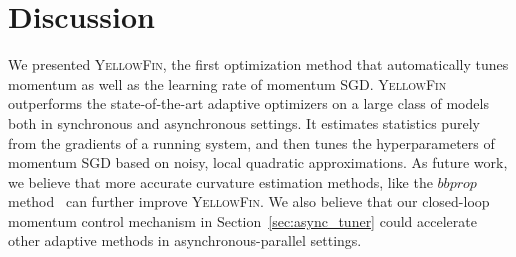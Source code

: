 \documentclass{article}
\newcommand{\tuner}{\textsc{YellowFin}\xspace}
\begin{document}
\vspace{-0.5em}
\section{Discussion}
\label{sec:discussion}
\vspace{-0.45em}
We presented \tuner, the first optimization method that automatically tunes momentum as well as the learning rate of momentum SGD. 
\tuner outperforms the state-of-the-art adaptive optimizers on a large class of models both in synchronous and asynchronous settings.
It estimates statistics purely from the gradients of a running system,
and then tunes the hyperparameters of momentum SGD based on noisy, local quadratic approximations.
As future work, we believe that more accurate curvature estimation methods,
like the $bbprop$ method~\citep{martens2012estimating} can further improve \tuner.
We also believe that our closed-loop momentum control mechanism in Section~\ref{sec:async_tuner} 
could accelerate other adaptive methods in asynchronous-parallel settings.


\nocite{langley00}





\appendix 

%
%

%





%
%
%
%
\end{document}

